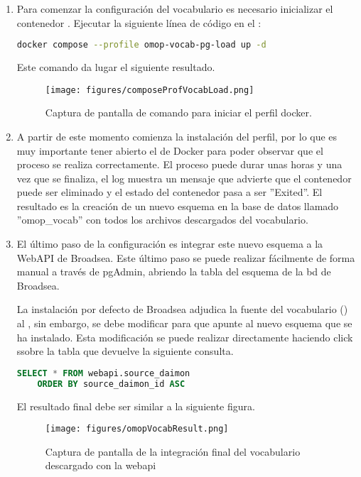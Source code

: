 \begin{enumerate}

    \item Para comenzar la configuración del vocabulario es necesario inicializar el contenedor . Ejecutar la siguiente línea de código en el :

    \begin{lstlisting}[language=sh]
    docker compose --profile omop-vocab-pg-load up -d\end{lstlisting}

    Este comando da lugar el siguiente resultado.

      \begin{figure}[H]
        \centering
        \texttt{[image: figures/composeProfVocabLoad.png]}
        \caption{Captura de pantalla de comando para iniciar el perfil docker.}
        \label{fig:composeProfVocabLoad}
    \end{figure}

    \item A partir de este momento comienza la instalación del perfil, por lo que es muy importante tener abierto el  de Docker para poder observar que el proceso se realiza correctamente. El proceso puede durar unas horas y una vez que se finaliza, el log muestra un mensaje que advierte que el contenedor puede ser eliminado y el estado del contenedor pasa a ser ''Exited''. El resultado es la creación de un nuevo esquema en la base de datos llamado ''omop\_vocab'' con todos los archivos descargados del vocabulario. 

    \item El último paso de la configuración es integrar este nuevo esquema a la WebAPI de Broadsea. Este último paso se puede realizar fácilmente de forma manual a través de pgAdmin, abriendo la tabla  del esquema  de la bd de Broadsea.

    La instalación por defecto de Broadsea adjudica la fuente del vocabulario () al , sin embargo, se debe modificar para que apunte al nuevo esquema  que se ha instalado. Esta modificación se puede realizar directamente haciendo click ssobre la tabla que devuelve la siguiente consulta.

    \begin{lstlisting}[language=sql]
    SELECT * FROM webapi.source_daimon
    ORDER BY source_daimon_id ASC \end{lstlisting}

    El resultado final debe ser similar a la siguiente figura.

    \begin{figure}[H]
        \centering
        \texttt{[image: figures/omopVocabResult.png]}
        \caption{Captura de pantalla de la integración final del vocabulario descargado con la webapi}
        \label{fig:omopVocabResult}
    \end{figure}

\end{enumerate}

